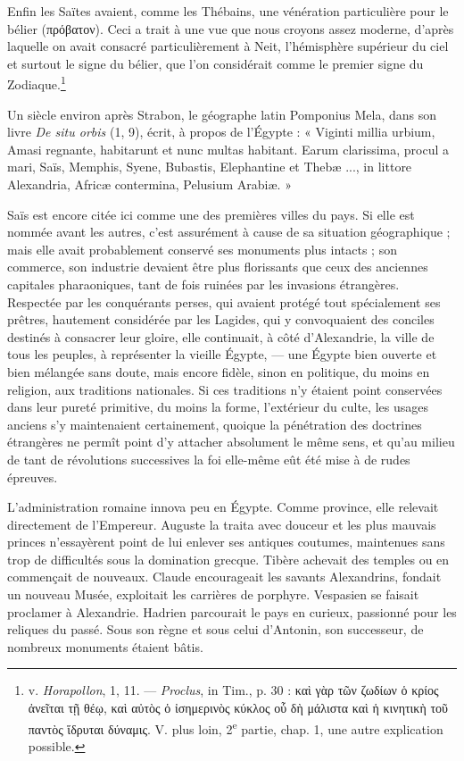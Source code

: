 \documentclass[letterpaper,twocolumn,openany,nodeprecatedcode]{dndbook}
\begin{document}
Enfin les Saïtes avaient, comme les Thébains, une vénération particulière pour le bélier (πρόβατον). Ceci a trait à une vue que nous croyons assez moderne, d'après laquelle on avait consacré particulièrement à Neit, l'hémisphère supérieur du ciel et surtout le signe du bélier, que l'on considérait comme le premier signe du Zodiaque.\footnote{v. \emph{Horapollon}, 1, 11. --- \emph{Proclus}, in Tim., p. 30 : καὶ γὰρ τῶν ζωδίων ὁ κρίος ἀνεῖται τῇ θέῳ, καὶ αὐτὸς ὁ ἰσημερινὸς κύκλος οὗ δὴ μάλιστα καὶ ἡ κινητικὴ τοῦ παντὸς ἵδρυται δύναμις. V. plus loin, 2\textsuperscript{e} partie, chap. 1, une autre explication possible.}

Un siècle environ après Strabon, le géographe latin Pomponius Mela, dans son livre \emph{De situ orbis} (1, 9), écrit, à propos de l'Égypte : « Viginti millia urbium, Amasi regnante, habitarunt et nunc multas habitant. Earum clarissima, procul a mari, Saïs, Memphis, Syene, Bubastis, Elephantine et Thebæ ..., in littore Alexandria, Africæ contermina, Pelusium Arabiæ. »

Saïs est encore citée ici comme une des premières villes du pays. Si elle est nommée avant les autres, c'est assurément à cause de sa situation géographique ; mais elle avait probablement conservé ses monuments plus intacts ; son commerce, son industrie devaient être plus florissants que ceux des anciennes capitales pharaoniques, tant de fois ruinées par les invasions étrangères. Respectée par les conquérants perses, qui avaient protégé tout spécialement ses prêtres, hautement considérée par les Lagides, qui y convoquaient des conciles destinés à consacrer leur gloire, elle continuait, à côté d'Alexandrie, la ville de tous les peuples, à représenter la vieille Égypte, --- une Égypte bien ouverte et bien mélangée sans doute, mais encore fidèle, sinon en politique, du moins en religion, aux traditions nationales. Si ces traditions n'y étaient point conservées dans leur pureté primitive, du moins la forme, l'extérieur du culte, les usages anciens s'y maintenaient certainement, quoique la pénétration des doctrines étrangères ne permît point d'y attacher absolument le même sens, et qu'au milieu de tant de révolutions successives la foi elle-même eût été mise à de rudes épreuves.

L'administration romaine innova peu en Égypte. Comme province, elle relevait directement de l'Empereur. Auguste la traita avec douceur et les plus mauvais princes n'essayèrent point de lui enlever ses antiques coutumes, maintenues sans trop de difficultés sous la domination grecque. Tibère achevait des temples ou en commençait de nouveaux. Claude encourageait les savants Alexandrins, fondait un nouveau Musée, exploitait les carrières de porphyre. Vespasien se faisait proclamer à Alexandrie. Hadrien parcourait le pays en curieux, passionné pour les reliques du passé. Sous son règne et sous celui d'Antonin, son successeur, de nombreux monuments étaient bâtis.
\end{document}
